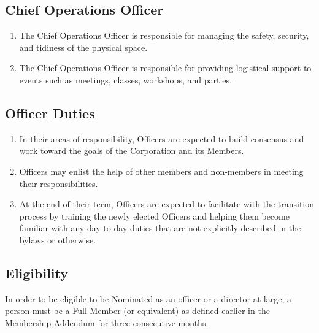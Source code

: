 \documentclass{article}
\begin{document}
\subsection{Chief Operations Officer}
\begin{enumerate}
\item The Chief Operations Officer is responsible for managing the safety, security, and 
tidiness of the physical space.
\item The Chief Operations Officer is responsible for providing logistical support to events 
such as meetings, classes, workshops, and parties.
\end{enumerate}
\subsection{Officer Duties}
\begin{enumerate}
\item In their areas of responsibility, Officers are expected to build consensus and work 
toward the goals of the Corporation and its Members.
\item Officers may enlist the help of other members and non-members in meeting their 
responsibilities.
\item At the end of their term, Officers are expected to facilitate with the transition 
process by training the newly elected Officers and helping them become familiar with any 
day-to-day duties that are not explicitly described in the bylaws or otherwise.
\end{enumerate}
\subsection{Eligibility}
In order to be eligible to be Nominated as an officer or a director at large, a person must 
be a Full Member (or equivalent) as defined earlier in the Membership Addendum for three 
consecutive months.
\end{document}
